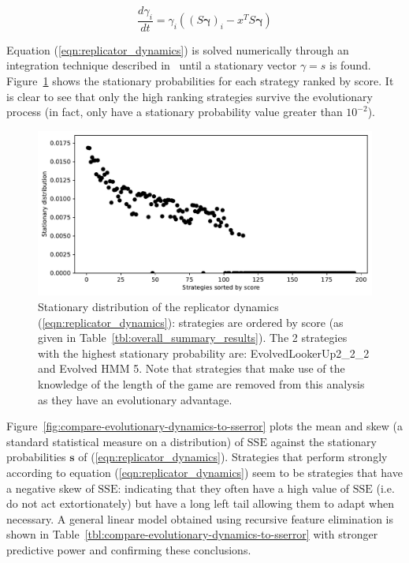 \documentclass[a4paper]{article}
\newcommand{\SSe}{\text{SSE}}
\begin{document}
\begin{equation}\label{eqn:replicator_dynamics}
    \frac{d \gamma_i}{dt} = \gamma_i ((S\boldsymbol{\gamma})_i - x^T S \boldsymbol{\gamma})
\end{equation}

Equation (\ref{eqn:replicator_dynamics}) is solved numerically through an
integration technique described in~\cite{Petzold1983} until a stationary vector
\(\gamma=s\) is found.
Figure~\ref{fig:replicator_dynamics} shows the stationary probabilities for each
strategy ranked by score.
It is clear to see that
only the high ranking strategies survive the evolutionary process (in fact,
only have a stationary
probability value greater than \(10 ^ {-2}\)).

\begin{figure}[!htbp]
    \centering
    \includegraphics[width=.8\textwidth]{./assets/img/replicator_dynamics/main.pdf}
    \caption{Stationary distribution of the replicator dynamics
    (\ref{eqn:replicator_dynamics}): strategies are ordered by score (as given
    in Table~\ref{tbl:overall_summary_results}). The 2
    strategies with the highest stationary probability are:
    EvolvedLookerUp2\_2\_2 and Evolved HMM 5.
    Note that
    strategies that make use of the knowledge of the length of the game are
    removed from this analysis as they have an evolutionary advantage.}
    \label{fig:replicator_dynamics}
\end{figure}

Figure~\ref{fig:compare-evolutionary-dynamics-to-sserror} plots the mean and
skew (a standard statistical measure on a distribution) of \(\SSe\) against the
stationary probabilities \(\textbf{s}\) of (\ref{eqn:replicator_dynamics}). Strategies
that perform strongly according to equation (\ref{eqn:replicator_dynamics}) seem
to be strategies that have a negative skew of \(\SSe\): indicating that they
often have a high value of \(\SSe\) (i.e. do not act extortionately) but have a
long left tail allowing them to adapt when necessary. A general linear model
obtained using recursive feature elimination is shown in
Table~\ref{tbl:compare-evolutionary-dynamics-to-sserror} with stronger
predictive power and confirming these conclusions.
\end{document}
